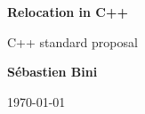 \begin{titlepage}
    \begin{center}
        \vspace*{1cm}

        \Huge
        \textbf{Relocation in C++}

        \vspace{0.5cm}
        \LARGE
        C++ standard proposal

        \vspace{1.5cm}
        \Large

        \textbf{Sébastien Bini}

        \vspace{0.8cm}

        \today

    \end{center}
\end{titlepage}
